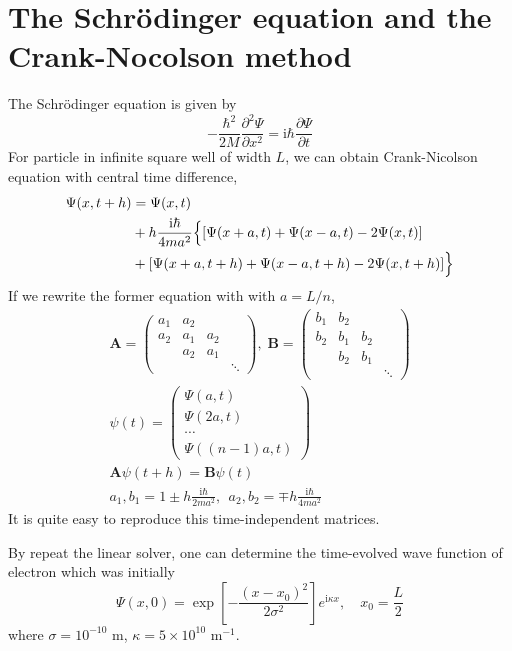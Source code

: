 \documentclass[reprint, nofootinbib]{revtex4-2} %
\newcommand{\pd}{\partial}
\newcommand{\im}{\mathrm{i}}
\newcommand{\V}[1]{\begin{pmatrix}#1\end{pmatrix}}
\begin{document}
\section{The Schr\"odinger equation and the Crank-Nocolson method}
The Schr\"odinger equation is given by
\begin{equation*}
	-\frac{\hbar^2}{2M}\frac{\pd^2\Psi}{\pd x^2} = \im\hbar \frac{\pd \Psi}{\pd t}
\end{equation*}
For particle in infinite square well of width $L$, we can obtain Crank-Nicolson equation with central time difference,
\begin{align*}
	\Psi(x, t+h) &= \Psi(x,t)\\
	&+ h\frac{\im\hbar}{4ma^2}\Bigl\{\left[\Psi(x+a, t)+\Psi(x-a, t)-2\Psi(x,t)\right]\\
	&+ \left[\Psi(x+a, t+h) + \Psi(x-a, t+h) - 2\Psi(x, t+h)\right]\Bigr\}
\end{align*}
If we rewrite the former equation with with $a = L/n$,
\begin{gather*}
	\mathbf{A} = \V{a_1&a_2\\a_2&a_1&a_2\\ &a_2&a_1 \\ &&&\ddots}\!,\; 
	\mathbf{B} = \V{b_1&b_2\\b_2&b_1&b_2\\ &b_2&b_1 \\ &&&\ddots}\\
	\psi(t) = \V{\Psi(a,t)\\\Psi(2a,t)\\\cdots\\\Psi((n-1)a,t)}\\
	\mathbf{A}\psi(t+h) = \mathbf{B}\psi(t)\\
	a_1,b_1 = 1\pm h\frac{\im\hbar}{2ma^2}, \;\,a_2,b_2 = \mp h\frac{\im\hbar}{4ma^2}
\end{gather*}
It is quite easy to reproduce this time-independent matrices.

By repeat the linear solver, one can determine the time-evolved wave function of electron which was initially
\begin{equation*}
	\Psi(x,0) = \exp\left[-\frac{(x-x_0)^2}{2\sigma^2}\right]e^{\im \kappa x}, \quad x_0 = \frac{L}{2}
\end{equation*}
where $\sigma = 10^{-10}$ m, $\kappa = 5\times 10^{10}$ m$^{-1}$.
\end{document}
